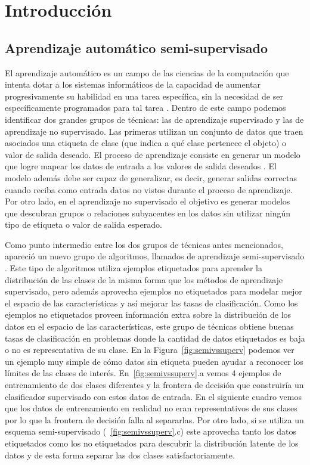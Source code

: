 \chapter{Introducción}
\section{Aprendizaje automático semi-supervisado}

El aprendizaje automático es un campo de las ciencias de la computación que intenta dotar a los sistemas informáticos de la capacidad de aumentar
progresivamente su habilidad en una tarea específica, sin la necesidad de ser específicamente programados para tal tarea \citep{samuel1959some}. Dentro de este
campo podemos identificar dos grandes grupos de técnicas: las de aprendizaje supervisado y las de aprendizaje no supervisado. Las primeras utilizan un conjunto
de datos que traen asociados una etiqueta de clase (que indica a qué clase pertenece el objeto) o valor de salida deseado. El proceso de aprendizaje consiste en
generar un modelo que logre mapear los datos de entrada a los valores de salida deseados \citep{russell2016artificial}. El modelo además debe ser capaz de
generalizar, es decir, generar salidas correctas cuando reciba como entrada datos no vistos durante el proceso de aprendizaje. Por otro lado, en el aprendizaje
no supervisado el objetivo es generar modelos que descubran grupos o relaciones subyacentes en los datos sin utilizar ningún tipo de etiqueta o valor de salida
esperado.

Como punto intermedio entre los dos grupos de técnicas antes mencionados, apareció un nuevo grupo de algoritmos, llamados de aprendizaje
semi-supervisado \citep{chapelle2006semi}. Este tipo de algoritmos utiliza ejemplos etiquetados para aprender la distribución de las clases de la misma forma
que los métodos de aprendizaje supervisado, pero además aprovecha ejemplos no etiquetados para modelar mejor el espacio de las características y así mejorar las
tasas de clasificación. Como los ejemplos no etiquetados proveen información extra sobre la distribución de los datos en el espacio de las características, este
grupo de técnicas obtiene buenas tasas de clasificación en problemas donde la cantidad de datos etiquetados es baja o no es representativa de su clase.  En la
Figura~\ref{fig:semivssuperv} podemos ver un ejemplo muy simple de cómo datos sin etiqueta pueden ayudar a reconocer los límites de las clases de interés.
En~\ref{fig:semivssuperv}.a vemos 4 ejemplos de entrenamiento de dos clases diferentes y la frontera de decisión que construiría un clasificador supervisado con
estos datos de entrada. En el siguiente cuadro vemos que los datos de entrenamiento en realidad no eran representativos de sus clases por lo que la frontera de
decisión falla al separarlas. Por otro lado, si se utiliza un esquema semi-supervisado (~\ref{fig:semivssuperv}.c) este aprovecha tanto los datos etiquetados
como los no etiquetados para descubrir la distribución latente de los datos y de esta forma separar las dos clases satisfactoriamente.

